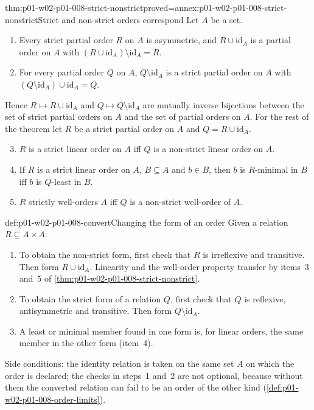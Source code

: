 \begin{hbtheorem}{thm:p01-w02-p01-008-strict-nonstrict}{proved=annex:p01-w02-p01-008-strict-nonstrict}{Strict and non-strict orders correspond}
Let \(A\) be a set.
\begin{enumerate}
  \item Every strict partial order \(R\) on \(A\) is asymmetric, and
        \(R\cup\mathrm{id}_A\) is a partial order on \(A\) with
        \((R\cup\mathrm{id}_A)\setminus\mathrm{id}_A=R\).
  \item For every partial order \(Q\) on \(A\), \(Q\setminus\mathrm{id}_A\)
        is a strict partial order on \(A\) with
        \((Q\setminus\mathrm{id}_A)\cup\mathrm{id}_A=Q\).
\end{enumerate}
Hence \(R\mapsto R\cup\mathrm{id}_A\) and \(Q\mapsto Q\setminus\mathrm{id}_A\)
are mutually inverse bijections between the set of strict partial orders on
\(A\) and the set of partial orders on \(A\). For the rest of the theorem let
\(R\) be a strict partial order on \(A\) and \(Q=R\cup\mathrm{id}_A\).
\begin{enumerate}
  \setcounter{enumi}{2}
  \item \(R\) is a strict linear order on \(A\) iff \(Q\) is a non-strict
        linear order on \(A\).
  \item If \(R\) is a strict linear order on \(A\), \(B\subseteq A\) and
        \(b\in B\), then \(b\) is \(R\)-minimal in \(B\) iff \(b\) is
        \(Q\)-least in \(B\).
  \item \(R\) strictly well-orders \(A\) iff \(Q\) is a non-strict
        well-order of \(A\).
\end{enumerate}
\end{hbtheorem}

\begin{hbmethod}{def:p01-w02-p01-008-convert}{Changing the form of an order}
Given a relation \(R\subseteq A\times A\):
\begin{enumerate}
  \item To obtain the non-strict form, first check that \(R\) is irreflexive
        and transitive. Then form \(R\cup\mathrm{id}_A\). Linearity and the
        well-order property transfer by items~3 and~5 of
        \cref{thm:p01-w02-p01-008-strict-nonstrict}.
  \item To obtain the strict form of a relation \(Q\), first check that
        \(Q\) is reflexive, antisymmetric and transitive. Then form
        \(Q\setminus\mathrm{id}_A\).
  \item A least or minimal member found in one form is, for linear orders,
        the same member in the other form (item~4).
\end{enumerate}
Side conditions: the identity relation is taken on the same set \(A\) on
which the order is declared; the checks in steps~1 and~2 are not optional,
because without them the converted relation can fail to be an order of the
other kind (\cref{def:p01-w02-p01-008-order-limits}).
\end{hbmethod}

